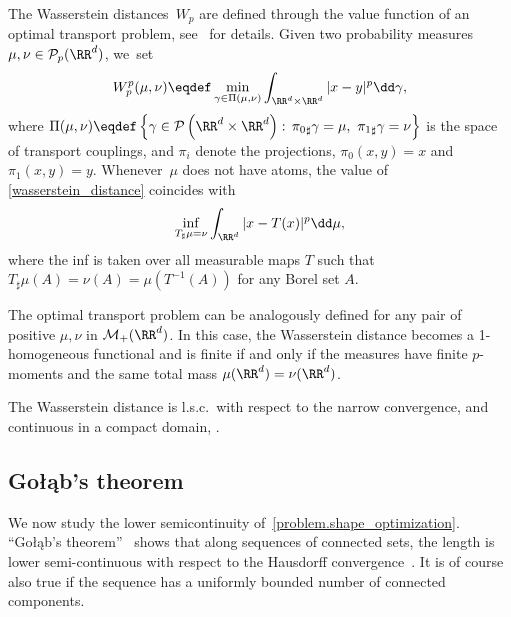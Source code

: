 The Wasserstein distan\-ces~$W_p$ are defined through the value function of an optimal transport problem, see~\cite{ambrosio2008gradient,santambrogio2015optimal,villani2009optimal} for details. Given two probability measures $\mu, \nu \in \mathcal{P}_p(\RR^d)$, we~set
\begin{equation}\label{wasserstein_distance}
W_p^p(\mu, \nu)
\eqdef
\min_{\gamma \in \Pi(\mu, \nu)}
\int_{\RR^d\times \RR^d} |x - y|^p\dd\gamma,
\end{equation}
where
$\Pi(\mu, \nu) \eqdef
\left\{
\gamma \in \mathcal{P}\left(\RR^d\times \RR^d\right) :
\,
{\pi_{0}}_\sharp\gamma = \mu, \
{\pi_{1}}_\sharp\gamma = \nu
\right\}
$
is the space of transport couplings, and $\pi_i$ denote the projections, \ie $\pi_0(x,y) = x$ and $\pi_1(x,y) = y$. Whenever~$\mu$ does not have atoms, the value of \eqref{wasserstein_distance} coincides with
\begin{equation}\label{wasserstein_distance.monge}
\inf_{
\substack{
T_{\sharp}\mu = \nu
}
}
\int_{\RR^d} |x - T(x)|^p\dd \mu,
\end{equation}
where the inf is taken over all measurable maps $T$ such that $T_\sharp\mu(A) = \nu(A) = \mu(T^{-1}(A))$ for any Borel set $A$.

The optimal transport problem can be analogously defined for any pair of positive $\mu, \nu$ in $\mathcal{M}_+(\RR^d)$. In this case, the Wasserstein distance becomes a 1-homogeneous functional and is finite if and only if the measures have finite $p$-moments and the same total mass $\mu(\RR^d) = \nu(\RR^d)$.

The Wasserstein distance is l.s.c.~with respect to the narrow convergence, and continuous in a compact domain, \cite[Lem.\,4.3]{villani2009optimal}.

\newcommand{\Golab}{Go\l\k{a}b}
\subsection{\Golab's theorem}
We now study the lower semicontinuity of~\eqref{problem.shape_optimization}.
``\Golab's theorem''~\cite{Golab} shows that along sequences of connected sets, the length is lower semi-continuous with respect to the Hausdorff convergence~\cite[Chap.\,10]{morel2012variational}.
It is of course also true if the sequence has a uniformly bounded number of connected components.

